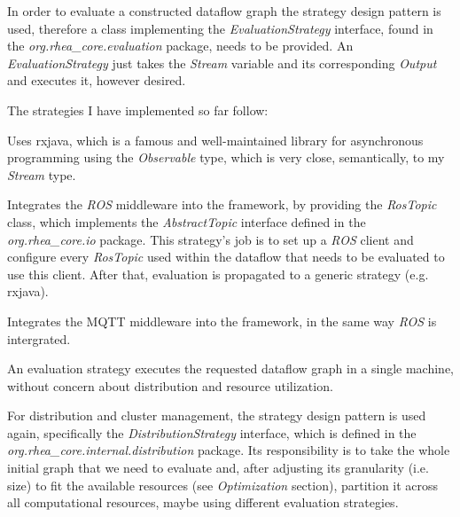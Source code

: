 \documentclass{dithesis}
\begin{document}
In order to evaluate a constructed dataflow graph the strategy design pattern is used, therefore a class implementing the \textit{EvaluationStrategy} interface, found in the \textit{org.rhea\_core.evaluation} package, needs to be provided. An \textit{EvaluationStrategy} just takes the \textit{Stream} variable and its corresponding \textit{Output} and executes it, however desired.

The strategies I have implemented so far follow:

\begin{description}[style=nextline]
\item[RxJavaEvaluationStrategy\site{https://github.com/rhea-flow/rx-eval}] 
Uses rxjava, which is a famous and well-maintained library for asynchronous programming using the \textit{Observable} type, which is very close, semantically, to my \textit{Stream} type.

\item[RosEvaluationStrategy\site{https://github.com/rhea-flow/ros-eval}] 
Integrates the \textit{ROS} middleware into the framework, by providing the \textit{RosTopic} class, which implements the \textit{AbstractTopic} interface defined in the \textit{org.rhea\_core.io} package. This strategy's job is to set up a \textit{ROS} client and configure every \textit{RosTopic} used within the dataflow that needs to be evaluated to use this client. After that, evaluation is propagated to a generic strategy (e.g. rxjava).

\item[MqttEvaluationStrategy\site{https://github.com/rhea-flow/mqtt-eval}] 
Integrates the MQTT middleware into the framework, in the same way \textit{ROS} is intergrated.
\end{description}


An evaluation strategy executes the requested dataflow graph in a single machine, without concern about distribution and resource utilization.

For distribution and cluster management, the strategy design pattern is used again, specifically the \textit{DistributionStrategy} interface, which is defined in the \textit{org.rhea\_core.internal.distribution} package. Its responsibility is to take the whole initial graph that we need to evaluate and, after adjusting its granularity (i.e. size) to fit the available resources (see \textit{Optimization} section), partition it across all computational resources, maybe using different evaluation strategies.
\end{document}

